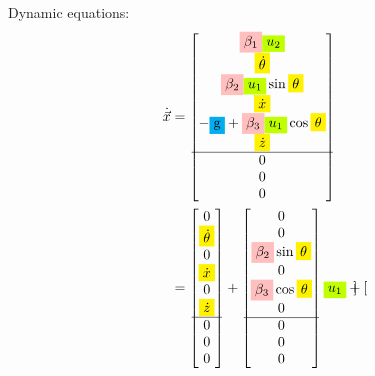 \documentclass[12pt]{article}
\begin{document}
Dynamic equations:
\begin{align*}
    \dot{\vec{x}} &= \begin{bmatrix}
        \colorbox{pink}{$\beta_1$} \colorbox{lime}{$u_2$} \\
        \colorbox{yellow}{$\dot{\theta}$} \\
        \colorbox{pink}{$\beta_2$} \colorbox{lime}{$u_1$} \sin{\colorbox{yellow}{$\theta$}} \\ 
        \colorbox{yellow}{$\dot{x}$} \\
        -\colorbox{cyan}{g}+\colorbox{pink}{$\beta_3$} \colorbox{lime}{$u_1$} \cos{\colorbox{yellow}{$\theta$}} \\
        \colorbox{yellow}{$\dot{z}$} \\
        \hline
        0 \\
        0 \\
        0 \\
    \end{bmatrix} \\
    &= \begin{bmatrix}
            0 \\
            \colorbox{yellow}{$\dot{\theta}$} \\
            0 \\
            \colorbox{yellow}{$\dot{x}$} \\
            0 \\
            \colorbox{yellow}{$\dot{z}$} \\
            \hline
            0 \\
            0 \\
            0 \\
        \end{bmatrix} +  \begin{bmatrix}
            0 \\
            0 \\
            \colorbox{pink}{$\beta_2$} \sin{\colorbox{yellow}{$\theta$}} \\
            0 \\
            \colorbox{pink}{$\beta_3$} \cos{\colorbox{yellow}{$\theta$}} \\
            0 \\
            \hline
            0 \\
            0 \\
            0 \\
        \end{bmatrix} \colorbox{lime}{$u_1$} +  \begin{bmatrix}

\end{bmatrix}
\end{align*}
\end{document}
